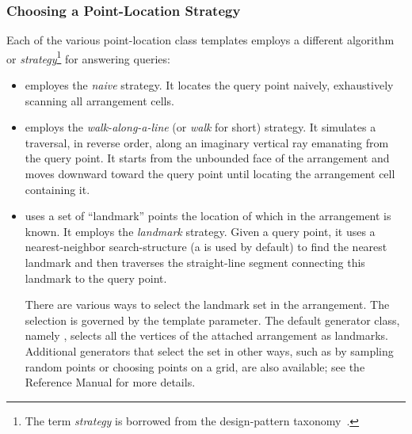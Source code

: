 \subsubsection{Choosing a Point-Location Strategy\label{arr_sssec:pl_strat}}
Each of the various point-location class templates employs a different
algorithm or \emph{strategy}\footnote{The term \emph{strategy}
is borrowed from the design-pattern
taxonomy~\cite[Chapter~5]{ghjv-dp-95}.} for answering queries:
\begin{itemize}
\item {} employes the
  \emph{naive} strategy. It locates the query point naively,
  exhaustively scanning all arrangement cells.
\item {} employs
  the \emph{walk-along-a-line} (or \emph{walk} for short) strategy.
  It simulates a traversal, in reverse order, along an imaginary
  vertical ray emanating from the query point. It starts from the
  unbounded face of the arrangement and moves downward toward the
  query point until locating the arrangement cell containing it.
\item {}
  uses a set of ``landmark'' points the location of which in the
  arrangement is known. It employs the
  \emph{landmark} strategy. Given a query point, it uses a
  nearest-neighbor search-structure (a \kdtree{} is used by default)
  to find the nearest landmark and then traverses the straight-line
  segment connecting this landmark to the query point.

  There are various ways to select the landmark set in the
  arrangement. The selection is governed by the 
  template parameter. The default generator class, namely
  , selects all the vertices of
  the attached arrangement as landmarks. Additional generators that
  select the set in other ways, such as by sampling random
  points or choosing points on a grid, are also available; see the
  Reference Manual for more details.


\end{itemize}
